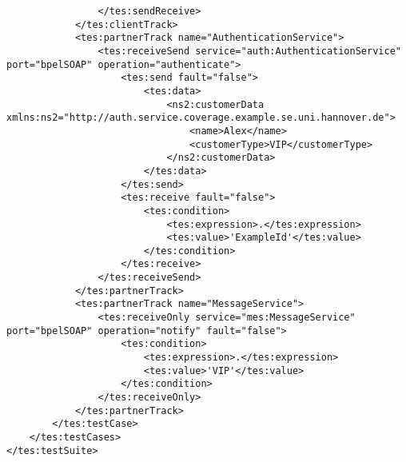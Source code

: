 \begin{appendix}
\begin{tiny}
\begin{verbatim}
                </tes:sendReceive>
            </tes:clientTrack>
            <tes:partnerTrack name="AuthenticationService">
                <tes:receiveSend service="auth:AuthenticationService" port="bpelSOAP" operation="authenticate">
                    <tes:send fault="false">
                        <tes:data>
                            <ns2:customerData xmlns:ns2="http://auth.service.coverage.example.se.uni.hannover.de">
                                <name>Alex</name>
                                <customerType>VIP</customerType>
                            </ns2:customerData>
                        </tes:data>
                    </tes:send>
                    <tes:receive fault="false">
                        <tes:condition>
                            <tes:expression>.</tes:expression>
                            <tes:value>'ExampleId'</tes:value>
                        </tes:condition>
                    </tes:receive>
                </tes:receiveSend>
            </tes:partnerTrack>
            <tes:partnerTrack name="MessageService">
                <tes:receiveOnly service="mes:MessageService" port="bpelSOAP" operation="notify" fault="false">
                    <tes:condition>
                        <tes:expression>.</tes:expression>
                        <tes:value>'VIP'</tes:value>
                    </tes:condition>
                </tes:receiveOnly>
            </tes:partnerTrack>
        </tes:testCase>
    </tes:testCases>
</tes:testSuite>
\end{verbatim}
\end{tiny}


\end{appendix}